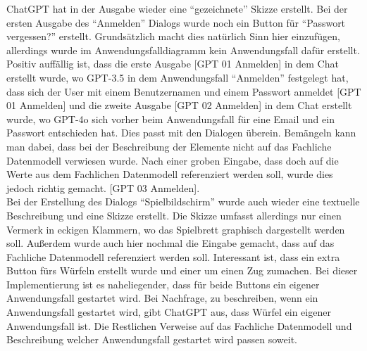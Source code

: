ChatGPT hat in der Ausgabe wieder eine ``gezeichnete'' Skizze erstellt. Bei der ersten Ausgabe des ``Anmelden'' Dialogs wurde
noch ein Button für ``Passwort vergessen?'' erstellt. Grundsätzlich macht dies natürlich Sinn hier einzufügen, allerdings wurde im Anwendungsfalldiagramm
kein Anwendungsfall dafür erstellt. Positiv auffällig ist, dass die erste Ausgabe [GPT 01 Anmelden] in dem Chat erstellt wurde, wo GPT-3.5 
in dem Anwendungsfall ``Anmelden'' festgelegt hat, dass sich der User mit einem Benutzernamen und einem Passwort anmeldet [GPT 01 Anmelden]
und die zweite Ausgabe [GPT 02 Anmelden] in dem Chat erstellt wurde, wo GPT-4o sich vorher beim Anwendungsfall für eine Email und ein Passwort 
entschieden hat. Dies passt mit den Dialogen überein. Bemängeln kann man dabei, dass bei der Beschreibung der Elemente nicht auf das 
Fachliche Datenmodell verwiesen wurde. Nach einer 
groben Eingabe, dass doch auf die Werte aus dem Fachlichen Datenmodell referenziert werden soll, wurde dies jedoch richtig gemacht. [GPT 03 Anmelden].\\
Bei der Erstellung des Dialogs ``Spielbildschirm'' wurde auch wieder eine textuelle Beschreibung und eine Skizze erstellt. Die Skizze umfasst
allerdings nur einen Vermerk in eckigen Klammern, wo das Spielbrett graphisch dargestellt werden soll. Außerdem wurde auch hier nochmal die Eingabe 
gemacht, dass auf das Fachliche Datenmodell referenziert werden soll. Interessant ist, dass ein extra Button fürs Würfeln erstellt wurde und einer um 
einen Zug zumachen. Bei dieser Implementierung ist es naheliegender, dass für beide Buttons ein eigener Anwendungsfall gestartet wird. Bei Nachfrage, zu 
beschreiben, wenn ein Anwendungsfall gestartet wird, gibt ChatGPT aus, dass Würfel ein eigener Anwendungsfall ist. Die Restlichen Verweise auf das 
Fachliche Datenmodell und Beschreibung welcher Anwendungsfall gestartet wird passen soweit.\\

